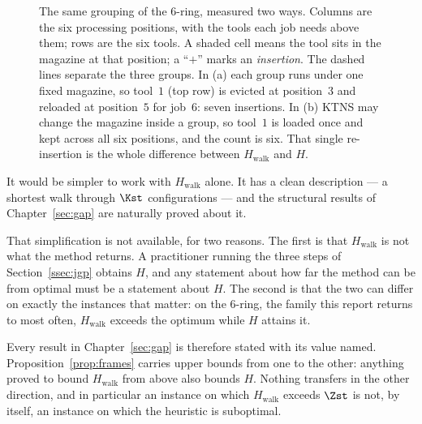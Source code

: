 \begin{figure}[t]
\caption{The same grouping of the $6$-ring, measured two ways. Columns are the
six processing positions, with the tools each job needs above them; rows are the
six tools. A shaded cell means the tool sits in the magazine at that position;
a ``$+$'' marks an \emph{insertion}. The dashed lines separate the three groups.
In (a) each group runs under one fixed magazine, so tool~$1$ (top row) is evicted
at position~$3$ and reloaded at position~$5$ for job~$6$: seven insertions. In
(b) KTNS may change the magazine inside a group, so tool~$1$ is loaded once and
kept across all six positions, and the count is six. That single re-insertion is
the whole difference between $H_{\mathrm{walk}}$ and $H$.}
\label{fig:frames}
\end{figure}

\begin{remark}\label{rem:frames}
It would be simpler to work with $H_{\mathrm{walk}}$ alone. It has a clean
description --- a shortest walk through $\Kst$ configurations --- and the
structural results of Chapter~\ref{sec:gap} are naturally proved about it.

That simplification is not available, for two reasons. The first is that
$H_{\mathrm{walk}}$ is not what the method returns. A practitioner running the
three steps of Section~\ref{ssec:jgp} obtains $H$, and any statement about how
far the method can be from optimal must be a statement about $H$. The second is
that the two can differ on exactly the instances that matter: on the $6$-ring,
the family this report returns to most often, $H_{\mathrm{walk}}$ exceeds the
optimum while $H$ attains it.

Every result in Chapter~\ref{sec:gap} is therefore stated with its value named.
Proposition~\ref{prop:frames} carries upper bounds from one to the other:
anything proved to bound $H_{\mathrm{walk}}$ from above also bounds $H$. Nothing
transfers in the other direction, and in particular an instance on which
$H_{\mathrm{walk}}$ exceeds $\Zst$ is not, by itself, an instance on which the
heuristic is suboptimal.
\end{remark}
